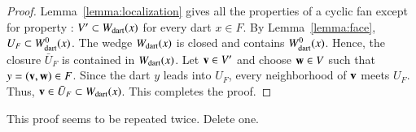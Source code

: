 \begin{proof}
Lemma~\ref{lemma:localization} gives all the properties of a cyclic fan except for property :
$V'\subset W_{\text{dart}}(x)$ for every dart
$x\in F$.    By Lemma~\ref{lemma:face},  $U_F \subset W^0_{\text{dart}}(x)$. 
The wedge $W_{\text{dart}}(x)$ is closed and contains $W^0_{\text{dart}}(x)$. Hence, the
closure $\bar U_F$ is contained in $W_{\text{dart}}(x)$.  Let ${\mathbf v}\in V'$ and choose
${\mathbf w}\in V$ such that $y=({\mathbf v},{\mathbf w})\in F$.
Since the dart $y$ leads into
$U_F$, every neighborhood of
${\mathbf v}$ meets $U_F$.  Thus, ${\mathbf v}\in \bar U_F\subset W_{\text{dart}}(x)$.  This completes
the proof.
\end{proof}


%





\begin{note}%
This proof seems to be repeated twice.  Delete one.
\end{note}

